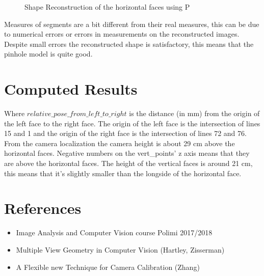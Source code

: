 \documentclass[11pt, oneside]{article}   	%
\begin{document}
\begin{figure}
 \centering
    \qquad
    \caption{Shape Reconstruction of the horizontal faces using P}%
    \label{hor_sr}%
\end{figure}
Measures of segments are a bit different from their real measures, this can be due to numerical errors or errors in measurements on the reconstructed images.
Despite small errors the reconstructed shape is satisfactory, this means that the pinhole model is quite good.
 
\section{Computed Results}
 

Where $relative\_pose\_from\_left\_to\_right$ is the distance (in mm) from the origin of the left face to the right face. The origin of the left face is the intersection of lines 15 and 1 and the origin of the right face is the intersection of lines 72 and 76.
From the camera localization the camera height is about 29 cm above the horizontal faces. 
Negative numbers on the vert\_points' z axis means that they are above the horizontal faces. The height of the vertical faces is around 21 cm, this means that it's slightly smaller than the longside of the horizontal face. 
 \section{References}
 \begin{itemize}
 \item Image Analysis and Computer Vision course Polimi 2017/2018
 \item Multiple View Geometry in Computer Vision (Hartley, Zisserman)
 \item A Flexible new Technique for Camera Calibration (Zhang)
 \end{itemize}
\end{document}
